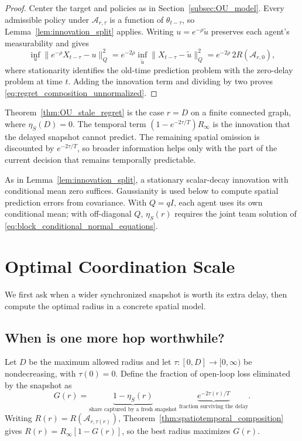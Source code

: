 \documentclass[11pt]{article}
\begin{document}
\begin{proof}
Center the target and policies as in Section~\ref{subsec:OU_model}.
Every admissible policy under $\mathcal A_{r,\tau}$ is a function of
$\theta_{t-\tau}$, so Lemma~\ref{lem:innovation_split} applies.
Writing $u=e^{-\rho}\tilde u$ preserves each agent's measurability and gives
\[
\inf_u\|e^{-\rho}X_{t-\tau}-u\|_Q^2
=e^{-2\rho}\inf_{\tilde u}\|X_{t-\tau}-\tilde u\|_Q^2
=e^{-2\rho}\,2R(\mathcal A_{r,0}),
\]
where stationarity identifies the old-time prediction problem with the
zero-delay problem at time $t$. Adding the innovation term and dividing by
two proves \eqref{eq:regret_composition_unnormalized}.
\end{proof}

Theorem~\ref{thm:OU_stale_regret} is the case $r=D$ on a finite connected
graph, where $\eta_S(D)=0$. The temporal term
$(1-e^{-2\tau/T})R_\infty$ is the innovation that the delayed snapshot
cannot predict. The remaining spatial omission is discounted by
$e^{-2\tau/T}$, so broader information helps only with the part of the
current decision that remains temporally predictable.

As in Lemma~\ref{lem:innovation_split}, a stationary scalar-decay innovation
with conditional mean zero suffices. Gaussianity is used below to compute
spatial prediction errors from covariance. With $Q=qI$, each agent uses its own
conditional mean; with off-diagonal $Q$, $\eta_S(r)$ requires the joint team
solution of \eqref{eq:block_conditional_normal_equations}.

\section{Optimal Coordination Scale}
\label{sec:optimal_coordination_scale}

We first ask when a wider synchronized snapshot is worth its extra delay,
then compute the optimal radius in a concrete spatial model.

\subsection{When is one more hop worthwhile?}
\label{subsec:radius_dependent_architectures}

Let $D$ be the maximum allowed radius and let
$\tau:[0,D]\to[0,\infty)$ be nondecreasing, with $\tau(0)=0$.
Define the fraction of open-loop loss eliminated by the snapshot as
\begin{equation}
G(r)=\underbrace{1-\eta_S(r)}_{\text{share captured by a fresh snapshot}}
     \;\underbrace{e^{-2\tau(r)/T}}_{\text{fraction surviving the delay}}.
\label{eq:snapshot_gain}
\end{equation}
Writing $R(r)=R(\mathcal A_{r,\tau(r)})$,
Theorem~\ref{thm:spatiotemporal_composition} gives
$R(r)=R_\infty[1-G(r)]$, so the best radius maximizes $G(r)$.
\end{document}
